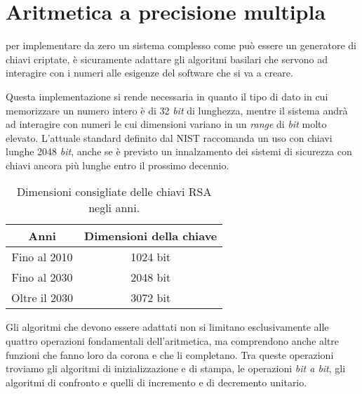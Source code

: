 
\chapter{Aritmetica a precisione multipla}

 per implementare da zero un sistema complesso come può essere un generatore di chiavi criptate, è sicuramente adattare gli algoritmi basilari che servono ad interagire con i numeri alle esigenze del software che si va a creare.

Questa implementazione si rende necessaria in quanto il tipo di dato in cui memorizzare un numero intero è di 32 \emph{bit} di lunghezza, mentre il sistema andrà ad interagire con numeri le cui dimensioni variano in un \emph{range} di \emph{bit} molto elevato. L'attuale standard definito dal NIST\cite{NIST} raccomanda un uso con chiavi lunghe 2048 \emph{bit}, anche se è previsto un innalzamento dei sistemi di sicurezza con chiavi ancora più lunghe entro il prossimo decennio.

\begin{table}[h]
	\label{dimensioniRSAnelTempo}
	\centering
	\begin{tabular}{cc}
		\toprule
		Anni & Dimensioni della chiave \\
		\midrule
		Fino al 2010 & 1024 bit\\
		Fino al 2030 & 2048 bit\\
		Oltre il 2030 & 3072 bit\\
		\bottomrule
	\end{tabular}
	\caption{Dimensioni consigliate delle chiavi RSA negli anni.}
\end{table}

Gli algoritmi che devono essere adattati non si limitano esclusivamente alle quattro operazioni fondamentali dell'aritmetica, ma comprendono anche altre funzioni che fanno loro da corona e che li completano. Tra queste operazioni troviamo gli algoritmi di inizializzazione e di stampa, le operazioni \emph{bit a bit}, gli algoritmi di confronto e quelli di incremento e di decremento unitario.

